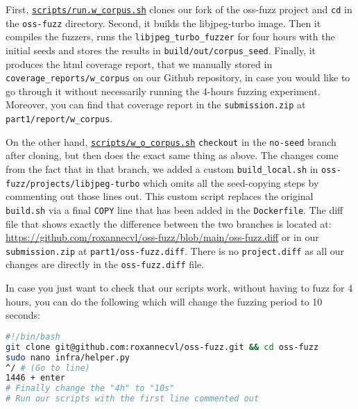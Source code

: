 \documentclass[12pt]{article}
\begin{document}
\noindent First, \href{https://github.com/roxannecvl/oss-fuzz/blob/main/scripts/run.w_corpus.sh}{\texttt{scripts/run.w\_corpus.sh}} clones our fork of the oss-fuzz project and \texttt{cd} in the \texttt{oss-fuzz} directory. Second, it builds the libjpeg-turbo image. Then it compiles the fuzzers, runs the \texttt{libjpeg\_turbo\_fuzzer} for four hours with the initial seeds and stores the results in \texttt{build/out/corpus\_seed}. Finally, it produces the html coverage report, that we manually stored in \texttt{coverage\_reports/w\_corpus} on our Github repository, in case you would like to go through it without necessarily running the 4-hours fuzzing experiment. Moreover, you can find that coverage report in the \texttt{submission.zip} at \texttt{part1/report/w\_corpus}. \\

\begin{sloppypar}
\noindent On the other hand,  \href{https://github.com/roxannecvl/oss-fuzz/blob/main/scripts/w_o_corpus.sh}{\texttt{scripts/w\_o\_corpus.sh}} \texttt{checkout} in the \texttt{no-seed} branch after cloning, but then does the exact same thing as above. The changes come from the fact that in that branch, we added a custom \texttt{build\_local.sh} in \texttt{oss-fuzz/projects/libjpeg-turbo} which omits all the seed-copying steps by commenting out those lines out. This custom script replaces the original \texttt{build.sh} via a final \texttt{COPY} line that has been added in the \texttt{Dockerfile}. The diff file that shows exactly the difference between the two branches is located at: \url{https://github.com/roxannecvl/oss-fuzz/blob/main/oss-fuzz.diff} or in our \texttt{submission.zip} at \texttt{part1/oss-fuzz.diff}. There is no \texttt{project.diff} as all our changes are directly in the \texttt{oss-fuzz.diff} file. \\
\end{sloppypar}

\noindent In case you just want to check that our scripts work, without having to fuzz for 4 hours, you can do the following which will change the fuzzing period to 10 seconds:

\begin{lstlisting}[language=bash]
#!/bin/bash
git clone git@github.com:roxannecvl/oss-fuzz.git && cd oss-fuzz
sudo nano infra/helper.py
^/ # (Go to line)
1446 + enter 
# Finally change the "4h" to "10s"
# Run our scripts with the first line commented out
\end{lstlisting}
\end{document}
